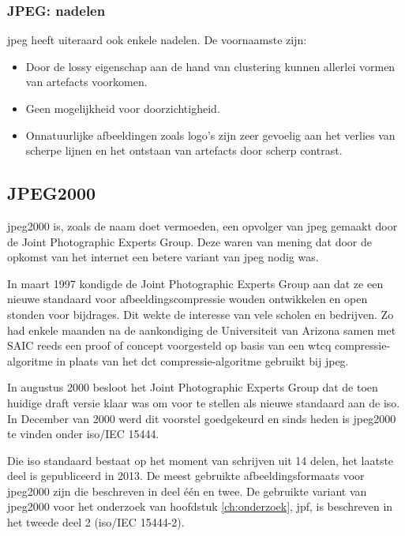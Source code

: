 \subsubsection{JPEG: nadelen}
\label{sec:afbeeldingscompressie-jpeg-nadelen}

\Gls{jpeg} heeft uiteraard ook enkele nadelen. De voornaamste zijn:

\begin{itemize}
	\item Door de \gls{lossy} eigenschap aan de hand van clustering kunnen allerlei vormen van \glspl{artefact} voorkomen.
	
	\item Geen mogelijkheid voor doorzichtigheid.
	
	\item Onnatuurlijke afbeeldingen zoals logo's zijn zeer gevoelig aan het verlies van scherpe lijnen en het ontstaan van \glspl{artefact} door scherp contrast.
\end{itemize}

\subsection{JPEG2000}
\label{sec:afbeeldingscompressie-jpeg2000}

\Gls{jpeg2000} is, zoals de naam doet vermoeden, een opvolger van \gls{jpeg} gemaakt door de Joint Photographic Experts Group. Deze waren van mening dat door de opkomst van het internet een betere variant van \gls{jpeg} nodig was.

In maart 1997 kondigde de Joint Photographic Experts Group aan dat ze een nieuwe standaard voor afbeeldingscompressie wouden ontwikkelen en open stonden voor bijdrages. Dit wekte de interesse van vele scholen en bedrijven. Zo had enkele maanden na de aankondiging de Universiteit van Arizona samen met SAIC reeds een proof of concept voorgesteld op basis van een \gls{wtcq} \gls{compressie-algoritme} in plaats van het \gls{dct} \gls{compressie-algoritme} gebruikt bij \gls{jpeg}.

In augustus 2000 besloot het Joint Photographic Experts Group dat de toen huidige draft versie klaar was om voor te stellen als nieuwe standaard aan de \gls{iso}. In December van 2000 werd dit voorstel goedgekeurd en sinds heden is  \gls{jpeg2000} te vinden onder \gls{iso}/IEC 15444. 

Die \gls{iso} standaard bestaat op het moment van schrijven uit 14 delen, het laatste deel is gepubliceerd in 2013. De meest gebruikte \glspl{afbeeldingsformaat} voor \gls{jpeg2000} zijn die beschreven in deel één en twee. De gebruikte variant van \gls{jpeg2000} voor het onderzoek van hoofdstuk \ref{ch:onderzoek}, \gls{jpf}, is beschreven in het tweede deel 2 (\gls{iso}/IEC 15444-2).

